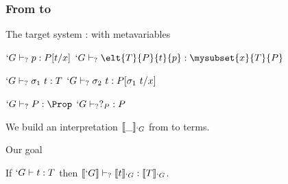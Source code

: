 \begin{frame}
  \frametitle{From \lng{} to \Coq}
  
  \begin{block}{The target system : \CIC{} with metavariables}
    \begin{center}
      {$`G \vdash_{?} p : P[t/x]$}
      {$`G \typec \elt{T}{P}{t}{p} : \mysubset{x}{T}{P}$}
      {}\DP
      
      \vspace{0.25cm}
      {$`G \vdash_{?} \sigma_1~t : T$}
      {}
      \DP
      \quad
      {$`G \vdash_{?} \sigma_2~t : P[\sigma_1~t/x]$}
      {}
      \DP

      \vspace{0.25cm}
      \UAX{}
      {$`G \typec P : \Prop$}
      {$`G \vdash_{?} ?_{P} : P$}
      {}\DP
    \end{center}
  \end{block}

  We build an interpretation $\llbracket \_ \rrbracket_{`G}$ from \Russell to \CICq
  terms.
  \pause  
  \begin{block}{Our goal}
    \begin{center}
      If $`G \vdash t : T$ then $\llbracket `G \rrbracket \vdash_{?} \llbracket t \rrbracket_{`G} : \llbracket T \rrbracket_{`G}$.
    \end{center}
  \end{block}
\end{frame}

